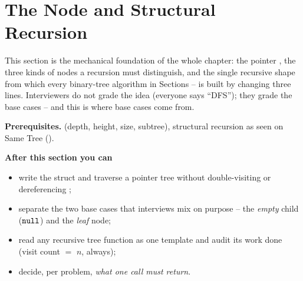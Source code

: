 \section{The Node and Structural Recursion}\label{sec:c02-model}

\begin{topicintro}
This section is the mechanical foundation of the whole chapter: the pointer
, the three kinds of nodes a recursion must distinguish, and the
single recursive shape from which every binary-tree algorithm in Sections
-- is built by changing three lines.
Interviewers do not grade the idea (everyone says ``DFS''); they grade the base
cases -- and this is where base cases come from.

\textbf{Prerequisites.}  (depth, height, size, subtree),
structural recursion as seen on Same Tree ().

\textbf{After this section you can}
\begin{itemize}[nosep]
  \item write the  struct and traverse a pointer tree without
        double-visiting or dereferencing \nil{};
  \item separate the two base cases that interviews mix on purpose -- the
        \emph{empty} child ($\texttt{null}$) and the \emph{leaf} node;
  \item read any recursive tree function as one template and audit its work done
        (visit count $=$ $n$, always);
  \item decide, per problem, \emph{what one call must return}.
\end{itemize}
\end{topicintro}

